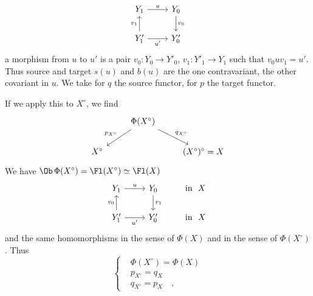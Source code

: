 \[
\begin{tikzcd}
Y_1 \arrow[r, "u"] & Y_0 \arrow[d, "v_0"] \\
Y'_1 \arrow[u, "v_1"] \arrow[r, "u'"{swap}] & Y'_0
\end{tikzcd}
\]
a morphism from $u$ to $u'$ is a pair $v_0 : Y_0 \to Y'_0$, $v_1 : Y'_1 \to Y_1$ such that $v_0uv_1 = u'$. Thus source and target $s(u)$ and $b(u)$ are the one contravariant, the other covariant in $u$. We take for $q$ the source functor, for $p$ the target functor. %

If we apply this to $X^{\circ}$, we find
\[
\begin{tikzcd}
& \Phi(X^{\circ}) \arrow[dl, "p_{X^{\circ}}"{swap}] \arrow[dr, "q_{X^{\circ}}"] & \\
X^{\circ} & & (X^{\circ})^{\circ} = X
\end{tikzcd}
\]
We have $\Ob\, \Phi(X^{\circ}) = \Fl(X^{\circ}) \simeq \Fl(X)$
\[
\begin{tikzcd}
Y_1 \arrow[r, "u"] & Y_0 \arrow[d, "v_1"] & \text{in}\ \ X \\
Y'_1 \arrow[u, "v_0"] \arrow[r, "u'"{swap}] & Y'_0 & \text{in}\ \ X
\end{tikzcd}
\]
and the same homomorphisms in the sense of $\Phi(X)$ and in the sense of $\Phi(X^{\circ})$. Thus
\[
\left\{
\begin{aligned}
&\Phi(X^{\circ}) = \Phi(X) \\
&p_{X^{\circ}} = q_X \\
&q_{X^{\circ}} = p_X \quad ,
\end{aligned}
\right.
\]
